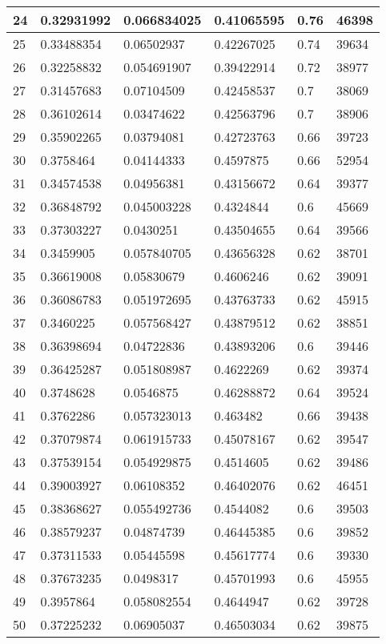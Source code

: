 \begin{longtable}{|l|l|l|l|l|l|}
24 & 0.32931992 & 0.066834025 & 0.41065595 & 0.76 & 46398 \\ \hline 
25 & 0.33488354 & 0.06502937 & 0.42267025 & 0.74 & 39634 \\ \hline 
26 & 0.32258832 & 0.054691907 & 0.39422914 & 0.72 & 38977 \\ \hline 
27 & 0.31457683 & 0.07104509 & 0.42458537 & 0.7 & 38069 \\ \hline 
28 & 0.36102614 & 0.03474622 & 0.42563796 & 0.7 & 38906 \\ \hline 
29 & 0.35902265 & 0.03794081 & 0.42723763 & 0.66 & 39723 \\ \hline 
30 & 0.3758464 & 0.04144333 & 0.4597875 & 0.66 & 52954 \\ \hline 
31 & 0.34574538 & 0.04956381 & 0.43156672 & 0.64 & 39377 \\ \hline 
32 & 0.36848792 & 0.045003228 & 0.4324844 & 0.6 & 45669 \\ \hline 
33 & 0.37303227 & 0.0430251 & 0.43504655 & 0.64 & 39566 \\ \hline 
34 & 0.3459905 & 0.057840705 & 0.43656328 & 0.62 & 38701 \\ \hline 
35 & 0.36619008 & 0.05830679 & 0.4606246 & 0.62 & 39091 \\ \hline 
36 & 0.36086783 & 0.051972695 & 0.43763733 & 0.62 & 45915 \\ \hline 
37 & 0.3460225 & 0.057568427 & 0.43879512 & 0.62 & 38851 \\ \hline 
38 & 0.36398694 & 0.04722836 & 0.43893206 & 0.6 & 39446 \\ \hline 
39 & 0.36425287 & 0.051808987 & 0.4622269 & 0.62 & 39374 \\ \hline 
40 & 0.3748628 & 0.0546875 & 0.46288872 & 0.64 & 39524 \\ \hline 
41 & 0.3762286 & 0.057323013 & 0.463482 & 0.66 & 39438 \\ \hline 
42 & 0.37079874 & 0.061915733 & 0.45078167 & 0.62 & 39547 \\ \hline 
43 & 0.37539154 & 0.054929875 & 0.4514605 & 0.62 & 39486 \\ \hline 
44 & 0.39003927 & 0.06108352 & 0.46402076 & 0.62 & 46451 \\ \hline 
45 & 0.38368627 & 0.055492736 & 0.4544082 & 0.6 & 39503 \\ \hline 
46 & 0.38579237 & 0.04874739 & 0.46445385 & 0.6 & 39852 \\ \hline 
47 & 0.37311533 & 0.05445598 & 0.45617774 & 0.6 & 39330 \\ \hline 
48 & 0.37673235 & 0.0498317 & 0.45701993 & 0.6 & 45955 \\ \hline 
49 & 0.3957864 & 0.058082554 & 0.4644947 & 0.62 & 39728 \\ \hline 
50 & 0.37225232 & 0.06905037 & 0.46503034 & 0.62 & 39875 \\ \hline 
\end{longtable}